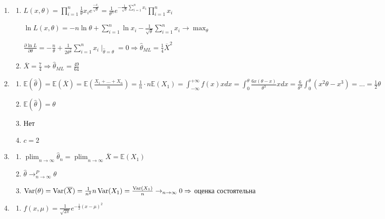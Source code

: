\documentclass[12pt, a4paper]{article}\usepackage[]{graphicx}\usepackage[]{color}
\DeclareMathOperator*\plim{plim}
\begin{document}
\begin{enumerate}
	\item
		\begin{enumerate}
			\item $L(x, \theta) = \prod_{i=1}^{n} \frac{1}{\theta} x_i e^{\frac{-x_i}{\sqrt{\theta}}} = \frac{1}{\theta^n} e^{-\frac{1}{\sqrt{\theta}} \sum_{i=1}^n x_i} \prod_{i=1}^{n}x_i$
			
			$\ln L(x, \theta) = -n \ln \theta + \sum_{i=1}^n \ln x_i - \frac{1}{\sqrt{\theta}} \sum_{i=1}^n x_i \to \max_\theta $
			
			$\frac{\partial \ln L}{\partial \theta} = -\frac{n}{\theta} + \frac{1}{2\theta^{\frac{3}{2}}} \sum_{i=1}^{n} x_i \mid_{\hat{\theta} = \theta} =0 \Rightarrow \hat{\theta}_{ML} = \frac{1}{4} \overline{X}^2$
			
			\item $\overline{X} = \frac{7}{4} \Rightarrow \hat{\theta}_{ML} = \frac{49}{64}$
		\end{enumerate}
		
	\item
		\begin{enumerate}
			\item $\mathbb{E}(\hat{\theta}) = \mathbb{E}(\overline{X}) = \mathbb{E} \left(\frac{X_1+...+X_n}{n} \right) = \frac{1}{n} \cdot n \mathbb{E}(X_1) = \int_{-\infty}^{+\infty} f(x)x dx = \int_{0}^{\theta} \frac{6x(\theta-x)}{\theta^3} x dx = \frac{6}{\theta^3} \int_{0}^{\theta} \left( x^2\theta - x^3\right) = ... = \frac{1}{2} \theta$
			\item $\mathbb{E}(\hat{\theta}) = \theta$
			\item Нет
			\item $c=2$
		\end{enumerate}
		
	\item
		\begin{enumerate}
			\item $\plim_{n\to\infty} \hat{\theta}_n = \plim_{n\to\infty} \overline{X} = \mathbb{E}(X_1)$
			\item $\hat{\theta} \to^P_{n\to\infty} \theta$
			\item $\operatorname{Var}(\theta) = \operatorname{Var}(\overline{X}) = \frac{1}{n^2}n\operatorname{Var}(X_1) = \frac{\operatorname{Var}(X_1)}{n} \to_{n\to\infty} 0 \Rightarrow$ оценка состоятельна
		\end{enumerate}
		
	\item
		\begin{enumerate}
			\item $f(x, \mu) =  \frac{1}{\sqrt{2 \pi}} e^{-\frac{1}{2} (x - \mu)^2}$
			

\end{enumerate}
\end{enumerate}
\end{document}
